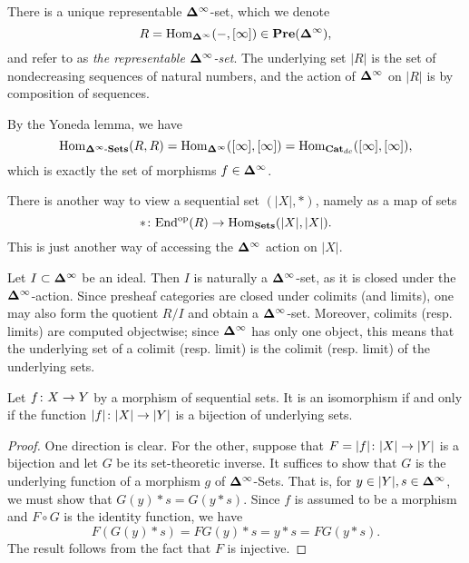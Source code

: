\documentclass{amsart}
\def\Del{{\bf \Delta}}
\def\dashSets{{\tn{-}\Sets}}
\def\Delinf{{\Del^\infty}}
\def\DSets{{\Delinf\dashSets}}
\def\Catdc{{\Cat_{dc}}}
\begin{document}
\begin{example}

There is a unique representable $\Delinf$-set, which we denote $$R=\Hom_\Delinf(-,[\infty])\in\Pre(\Delinf),$$ and refer to as {\em the representable $\Delinf$-set}.  The underlying set $|R|$ is the set of nondecreasing sequences of natural numbers, and the action of $\Delinf$ on $|R|$ is by composition of sequences.

By the Yoneda lemma, we have $$\Hom_{\DSets}(R,R)=\Hom_\Delinf([\infty],[\infty])=\Hom_\Catdc([\infty],[\infty]),$$ which is exactly the set of morphisms $f\in\Delinf$.

There is another way to view a sequential set $(|X|,*)$, namely as a map of sets $$*\colon\textnormal{End}^\textnormal{op}(R)\rightarrow\textnormal{Hom}_{\bf Sets}(|X|,|X|).$$  This is just another way of accessing the $\Delinf$ action on $|X|$.

Let $I\ss\Delinf$ be an ideal.  Then $I$ is naturally a $\Delinf$-set, as it is closed under the $\Delinf$-action.  Since presheaf categories are closed under colimits (and limits), one may also form the quotient $R/I$ and obtain a $\Delinf$-set.  Moreover, colimits (resp. limits) are computed objectwise; since $\Delinf$ has only one object, this means that the underlying set of a colimit (resp. limit) is the colimit (resp. limit) of the underlying sets.

\end{example}

\begin{lemma}

Let $f\colon X\rightarrow Y$ by a morphism of sequential sets.  It is an isomorphism if and only if the function $|f|\colon|X|\rightarrow|Y|$ is a bijection of underlying sets.

\end{lemma}

\begin{proof}

One direction is clear.  For the other, suppose that $F=|f|\colon|X|\rightarrow|Y|$ is a bijection and let $G$ be its set-theoretic inverse.  It suffices to show that $G$ is the underlying function of a morphism $g$ of $\Delinf$-Sets.  That is, for $y\in|Y|,s\in\Delinf$, we must show that $G(y)*s=G(y*s)$.  Since $f$ is assumed to be a morphism and $F\circ G$ is the identity function, we have $$F(G(y)*s)=FG(y)*s=y*s=FG(y*s).$$  The result follows from the fact that $F$ is injective.

\end{proof}
\end{document}
